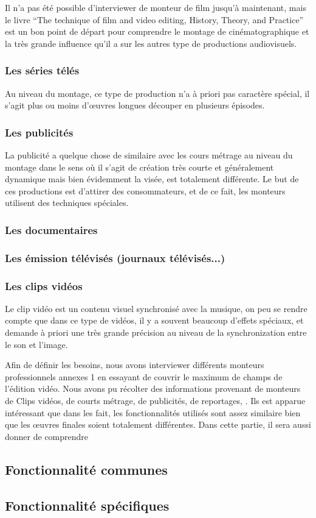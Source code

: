       Il n'a pas été possible d'interviewer de monteur de film jusqu'à maintenant, mais
      le livre ``The technique of film and video editing, History, Theory, and Practice''
      \cite{TheTechniqueOfFilmAndVideoEditing} est un bon point de départ pour
      comprendre le montage de cinématographique et la très grande influence qu'il a
      sur les autres type de productions audiovisuels.
    \subsubsection {Les séries télés}
      Au niveau du montage, ce type de production n'a à priori pas caractère spécial, il
      s'agit plus ou moins d'œuvres longues découper en plusieurs épisodes.
    \subsubsection {Les publicités}
      La publicité a quelque chose de similaire avec les cours métrage au niveau du
      montage dans le sens où il s'agit de création très courte et généralement dynamique
      mais bien évidemment la visée, est totalement différente. Le but de ces productions
      est d'attirer des consommateurs, et de ce fait, les monteurs utilisent des
      techniques spéciales.
    \subsubsection {Les documentaires}
    \subsubsection {Les émission télévisés (journaux télévisés...)}
    \subsubsection {Les clips vidéos}
      Le clip vidéo est un contenu visuel synchronisé avec la musique, on peu se
      rendre compte que dans ce type de vidéos, il y a souvent beaucoup d'effets
      spéciaux, et demande à priori une très grande précision au niveau de la
      synchronization entre le son et l'image. %

  Afin de définir les besoins, nous avons interviewer différents
  monteurs professionnels annexes 1 en essayant de couvrir le %
  maximum de champs de l'édition vidéo. Nous avons pu récolter des
  informations provenant de monteurs de Clips vidéos, de courts métrage,
  de publicités, de reportages, . Ils est apparue intéressant que dans %
  les fait, les fonctionnalités utilisés sont assez similaire bien que
  les œuvres finales soient totalement différentes. Dans cette partie,
  il sera aussi donner de comprendre


  \subsection{Fonctionnalité communes}
  \subsection{Fonctionnalité spécifiques}
